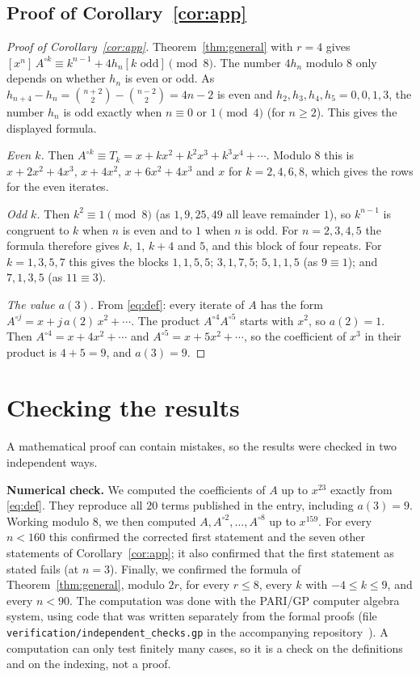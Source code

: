 \documentclass[11pt,a4paper]{article}
\theoremstyle{definition}
\theoremstyle{remark}
\newcommand{\coeff}[2]{[x^{#1}]\,#2}
\newcommand{\para}[1]{\par\medskip\noindent\textbf{#1}\enspace}
\begin{document}
\subsection{Proof of Corollary~\ref{cor:app}}

\begin{proof}[Proof of Corollary~\ref{cor:app}]
Theorem~\ref{thm:general} with $r=4$ gives $\coeff{n}{A^{\circ k}}\equiv k^{n-1}+4h_n[k\text{ odd}]\pmod8$. The number
$4h_n$ modulo $8$ only depends on whether $h_n$ is even or odd. As $h_{n+4}-h_n=\binom{n+2}{2}-\binom{n-2}{2}=4n-2$ is
even and $h_2,h_3,h_4,h_5=0,0,1,3$, the number $h_n$ is odd exactly when $n\equiv0$ or $1\pmod4$ (for $n\ge2$). This
gives the displayed formula.

\emph{Even $k$.} Then $A^{\circ k}\equiv T_k=x+kx^2+k^2x^3+k^3x^4+\cdots$. Modulo $8$ this is $x+2x^2+4x^3$,
$x+4x^2$, $x+6x^2+4x^3$ and $x$ for $k=2,4,6,8$, which gives the rows for the even iterates.

\emph{Odd $k$.} Then $k^2\equiv1\pmod8$ (as $1,9,25,49$ all leave remainder $1$), so $k^{n-1}$ is congruent to $k$
when $n$ is even and to $1$ when $n$ is odd. For $n=2,3,4,5$ the formula therefore gives $k$, $1$, $k+4$ and $5$, and
this block of four repeats. For $k=1,3,5,7$ this gives the blocks $1,1,5,5$; $3,1,7,5$; $5,1,1,5$ (as $9\equiv1$);
and $7,1,3,5$ (as $11\equiv3$).

\emph{The value $a(3)$.} From \eqref{eq:def}: every iterate of $A$ has the form $A^{\circ j}=x+j\,a(2)\,x^2+\cdots$.
The product $A^{\circ4}A^{\circ5}$ starts with $x^2$, so $a(2)=1$. Then $A^{\circ4}=x+4x^2+\cdots$ and
$A^{\circ5}=x+5x^2+\cdots$, so the coefficient of $x^3$ in their product is $4+5=9$, and $a(3)=9$.
\end{proof}

\section{Checking the results}\label{sec:checks}

A mathematical proof can contain mistakes, so the results were checked in two independent ways.

\para{Numerical check.}
We computed the coefficients of $A$ up to $x^{23}$ exactly from \eqref{eq:def}. They reproduce all
$20$ terms published in the entry, including $a(3)=9$. Working modulo $8$, we then computed $A,A^{\circ2},\dots,
A^{\circ8}$ up to $x^{159}$. For every $n<160$ this confirmed the corrected first statement and the seven other
statements of Corollary~\ref{cor:app}; it also confirmed that the first statement as stated fails (at $n=3$).
Finally, we confirmed the formula of Theorem~\ref{thm:general}, modulo $2r$, for every $r\le8$, every $k$ with
$-4\le k\le9$, and every $n<90$.
The computation was done with the PARI/GP computer algebra system, using code that was written separately from the
formal proofs (file \texttt{verification/independent\_checks.gp} in the accompanying repository~\cite{repo}).
A computation can only test finitely many cases, so it is a check on the definitions and on the indexing, not a proof.
\end{document}
